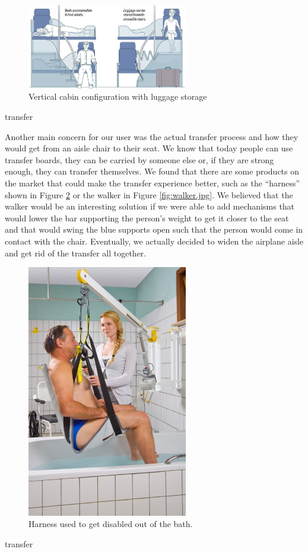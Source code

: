 \begin{figure}[h]
  \centering
     \includegraphics[width=7cm]{images/vertical_with_luggage.jpg}
   \caption{Vertical cabin configuration with luggage storage} %
  \label{fig:vertical_with_luggage.jpg}
\end{figure} 
transfer

Another main concern for our user was the actual transfer process and how they would get from an aisle chair to their seat. We know that today people can use transfer boards, they can be carried by someone else or, if they are strong enough, they can transfer themselves. We found that there are some products on the market that could make the transfer experience better, such as the “harness” shown in Figure \ref{fig:harness.jpg} or the walker in Figure \ref{fig:walker.jpg}. We believed that the walker would be an interesting solution if we were able to add mechanisms  that would lower the bar supporting the person’s weight to get it closer to the seat and that would swing the blue supports open such that the person would come in contact with the chair. Eventually, we actually decided to widen the airplane aisle and get rid of the transfer all together. 

\begin{figure}[h]
  \centering
     \includegraphics[width=7cm]{images/harness.jpg}
   \caption{Harness used to get disabled out of the bath.}%
  \label{fig:harness.jpg}
\end{figure} 
transfer


